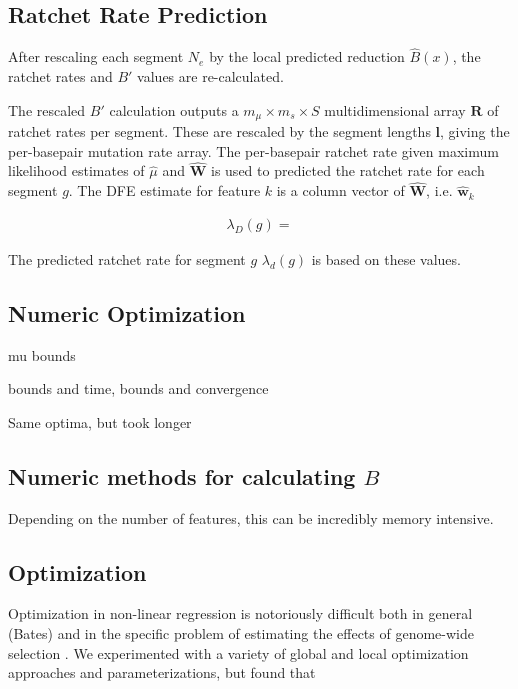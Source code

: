 \documentclass[11pt]{article}
\begin{document}
\subsection{Ratchet Rate Prediction}

After rescaling each segment $N_e$ by the local predicted reduction
$\hat{B}(x)$, the ratchet rates and $B'$ values are re-calculated. 

The rescaled $B'$ calculation outputs a $m_\mu \times m_s \times S$
multidimensional array $\mathbf{R}$ of ratchet rates per segment. These are
rescaled by the segment lengths $\mathbf{l}$, giving the per-basepair mutation
rate array. The per-basepair ratchet rate given maximum likelihood estimates of
$\hat{\mu}$ and $\widehat{\mathbf{W}}$ is used to predicted the ratchet rate
for each segment $g$. The DFE estimate for feature $k$ is a column vector of
$\widehat{\mathbf{W}}$, i.e. $\widehat{\mathbf{w}}_k$

\begin{align}
  \lambda_D(g) = 
\end{align}

The predicted ratchet rate for segment $g$ $\lambda_d(g)$ is based on these
values.
 
\subsection{Numeric Optimization}


mu bounds 

bounds and time, bounds and convergence

Same optima, but took longer



\subsection{Numeric methods for calculating $B$}

Depending on the number of features, this can be incredibly memory intensive.

\subsection{Optimization}

Optimization in non-linear regression is notoriously difficult both in general
(Bates) and in the specific problem of estimating the effects of genome-wide
selection \parencite{Murphy2022-sj}. We experimented with a variety of global
and local optimization approaches and parameterizations, but found that 
\end{document}
